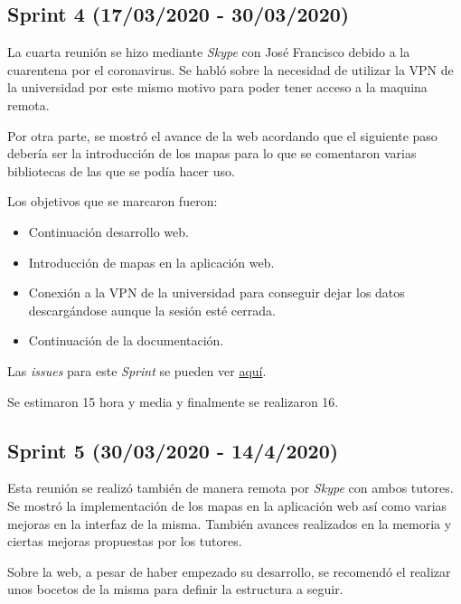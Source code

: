 
\subsection{Sprint 4 (17/03/2020 - 30/03/2020)}\label{Sprint-4}

La cuarta reunión se hizo mediante \emph{Skype} con José Francisco debido a la cuarentena por el coronavirus. Se habló sobre la necesidad de utilizar la VPN de la universidad por este mismo motivo para poder tener acceso a la maquina remota. 

Por otra parte, se mostró el avance de la web acordando que el siguiente paso debería ser la introducción de los mapas para lo que se comentaron varias bibliotecas de las que se podía hacer uso.

Los objetivos que se marcaron fueron:
\begin{itemize}
	\item Continuación desarrollo web.
	\item Introducción de mapas en la aplicación web.
	\item Conexión a la VPN de la universidad para conseguir dejar los datos descargándose aunque la sesión esté cerrada.
	\item Continuación de la documentación.
\end{itemize}

Las \emph{issues} para este \emph{Sprint} se pueden ver \href{https://github.com/psnti/TFG-Pablo-Santidrian-Tudanca/milestone/4}{aquí}.


Se estimaron 15 hora y media y finalmente se realizaron 16.

\subsection{Sprint 5 (30/03/2020 - 14/4/2020)}\label{Sprint-5}

Esta reunión se realizó también de manera remota por \emph{Skype} con ambos tutores. Se mostró la implementación de los mapas en la aplicación web así como varias mejoras en la interfaz de la misma. También avances realizados en la memoria y ciertas mejoras propuestas por los tutores.

Sobre la web, a pesar de haber empezado su desarrollo, se recomendó el realizar unos bocetos de la misma para definir la estructura a seguir.

